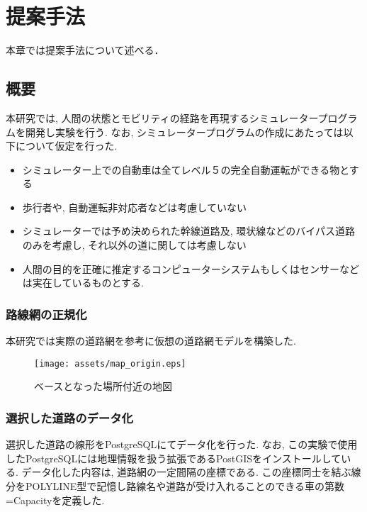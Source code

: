 \chapter{提案手法}
\label{proposed}

本章では提案手法について述べる．

\section{概要}

本研究では, 人間の状態とモビリティの経路を再現するシミュレータープログラムを開発し実験を行う.
なお, シミュレータープログラムの作成にあたっては以下について仮定を行った.

\begin{itemize}
    \item シミュレーター上での自動車は全てレベル５の完全自動運転ができる物とする
    \item 歩行者や, 自動運転非対応者などは考慮していない
    \item シミュレーターでは予め決められた幹線道路及, 環状線などのバイパス道路のみを考慮し, それ以外の道に関しては考慮しない
    \item 人間の目的を正確に推定するコンピューターシステムもしくはセンサーなどは実在しているものとする. 
\end{itemize}

\subsection{路線網の正規化}

本研究では実際の道路網を参考に仮想の道路網モデルを構築した.


\begin{figure}[H]
    \centering  %
    \texttt{[image: assets/map\_origin.eps]}
    \caption{ベースとなった場所付近の地図}  \label{sample}
\end{figure}


\subsection{選択した道路のデータ化}

選択した道路の線形をPostgreSQLにてデータ化を行った. なお, この実験で使用したPostgreSQLには地理情報を扱う拡張であるPostGISをインストールしている.
データ化した内容は, 道路網の一定間隔の座標である. この座標同士を結ぶ線分をPOLYLINE型で記憶し路線名や道路が受け入れることのできる車の第数=Capacityを定義した.

